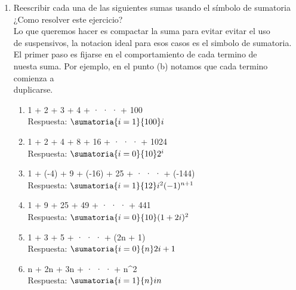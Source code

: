\ejercicio
\begin{enumerate}[label=\roman*)]
    \item Reescribir cada una de las siguientes sumas usando el símbolo de sumatoria\\ 
    
    ¿Como resolver este ejercicio?\\
    Lo que queremos hacer es compactar la suma para evitar evitar el uso\\
    de suspensivos, la notacion ideal para esos casos es el simbolo de sumatoria.\\
    El primer paso es fijarse en el comportamiento de cada termino de\\
    nuesta suma. Por ejemplo, en el punto (b) notamos que cada termino comienza a\\
    duplicarse.


    \begin{enumerate}[label=\alph*)] 
        \item  1 + 2 + 3 + 4 + · · · + 100\\
        Respuesta: $ \sumatoria{i=1}{100}i $\\

        \item  1 + 2 + 4 + 8 + 16 + · · · + 1024\\
        Respuesta: $ \sumatoria{i=0}{10}2^i $\\

        \item  1 + (-4) + 9 + (-16) + 25 + · · · + (-144)\\
        Respuesta: $ \sumatoria{i=1}{12}i^2(-1)^{n+1} $\\

        \item 1 + 9 + 25 + 49 + · · · + 441\\
        Respuesta: $ \sumatoria{i=0}{10}(1+2i)^2 $\\

        \item 1 + 3 + 5 + · · · + (2n + 1)\\
        Respuesta: $ \sumatoria{i=0}{n} 2i+1 $\\

        \item n + 2n + 3n + · · · + n^2\\
        Respuesta: $ \sumatoria{i=1}{n} in $\\
    \end{enumerate}
\end{enumerate}

